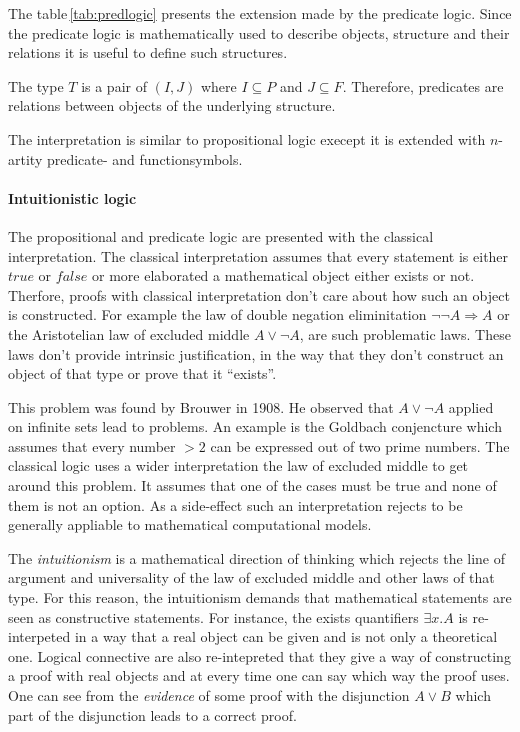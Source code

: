 The table\,\ref{tab:predlogic} presents the extension made by the predicate logic.
Since the predicate logic is mathematically used to describe objects,
structure and their relations it is useful to define such structures.~\cite{heinemann2013logik}

\begin{defi}
  The type $T$ is a pair of $(I,J)$ where $I\subseteq P$ and $J\subseteq F$.
  Therefore, predicates are relations between objects of the underlying
  structure.
\end{defi}

The interpretation is similar to propositional logic execept it is
extended with $n$-artity predicate- and functionsymbols.~\cite{heinemann2013logik}

\paragraph{Intuitionistic logic}
The propositional and predicate logic are presented with the classical
interpretation. The classical interpretation assumes that every statement
is either $true$ or $false$ or more elaborated a mathematical object either
exists or not. Therfore, proofs with classical interpretation don't care
about how such an object is constructed. For example the law of double
negation eliminitation  $\neg\neg A\Rightarrow A$ or the Aristotelian law of excluded
middle $A \vee \neg A$, are such problematic laws. These laws don't provide
intrinsic justification, in the way that they don't construct an object
of that type or prove that it ``exists''.~\cite{sep-logic-intuitionistic, kreitz1994automatisierte}

This problem was found by Brouwer in 1908. He observed that $A \vee \neg A$
applied on infinite sets lead to problems. An example is the Goldbach
conjencture which assumes that every number $> 2$ can be expressed out of
two prime numbers. The classical logic uses a wider interpretation
the law of excluded middle to get around this problem. It assumes
that one of the cases must be true and none of them is not an option.
As a side-effect such an interpretation rejects to be generally
appliable to mathematical computational models.~\cite{sep-logic-intuitionistic, sep-mathematics-constructive}

The \textit{intuitionism} is a mathematical direction of thinking which
rejects the line of argument and universality of the law of excluded middle
and other laws of that type. For this reason, the intuitionism demands
that mathematical statements are seen as constructive statements.
For instance, the exists quantifiers $\exists x.A$ is re-interpeted in a way
that a real object can be given and is not only a theoretical one.
Logical connective are also re-intepreted that they give a way
of constructing a proof with real objects and at every time one can
say which way the proof uses. One can see from the \textit{evidence}
of some proof with the disjunction $A\vee B$ which part of the disjunction
leads to a correct proof.~\cite{kreitz1994automatisierte}


